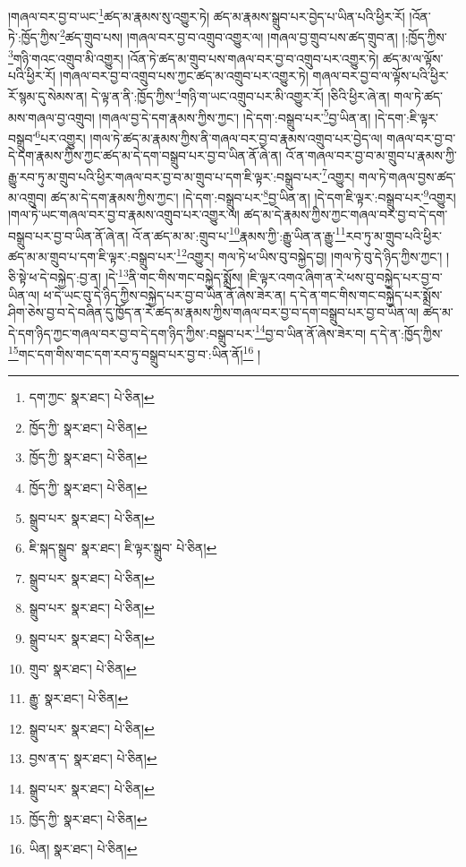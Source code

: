 །གཞལ་བར་བྱ་བ་ཡང་\footnote{དག་ཀྱང་  སྣར་ཐང་།  པེ་ཅིན། }ཚད་མ་རྣམས་སུ་འགྱུར་ཏེ། ཚད་མ་རྣམས་སྒྲུབ་པར་བྱེད་པ་ཡིན་པའི་ཕྱིར་རོ། །འོན་ཏེ་:ཁྱོད་ཀྱིས་\footnote{ཁྱོད་ཀྱི་  སྣར་ཐང་།  པེ་ཅིན། }ཚད་གྲུབ་པས། །གཞལ་བར་བྱ་བ་འགྲུབ་འགྱུར་ལ། །གཞལ་བྱ་གྲུབ་པས་ཚད་གྲུབ་ན། །:ཁྱོད་ཀྱིས་\footnote{ཁྱོད་ཀྱི་  སྣར་ཐང་།  པེ་ཅིན། }གཉི་གའང་འགྲུབ་མི་འགྱུར། །འོན་ཏེ་ཚད་མ་གྲུབ་པས་གཞལ་བར་བྱ་བ་འགྲུབ་པར་འགྱུར་ཏེ། ཚད་མ་ལ་ལྟོས་པའི་ཕྱིར་རོ། །གཞལ་བར་བྱ་བ་འགྲུབ་པས་ཀྱང་ཚད་མ་འགྲུབ་པར་འགྱུར་ཏེ། གཞལ་བར་བྱ་བ་ལ་ལྟོས་པའི་ཕྱིར་རོ་སྙམ་དུ་སེམས་ན། དེ་ལྟ་ན་ནི་:ཁྱོད་ཀྱིས་\footnote{ཁྱོད་ཀྱི་  སྣར་ཐང་།  པེ་ཅིན། }གཉི་ག་ཡང་འགྲུབ་པར་མི་འགྱུར་རོ། །ཅིའི་ཕྱིར་ཞེ་ན། གལ་ཏེ་ཚད་མས་གཞལ་བྱ་འགྲུབ། །གཞལ་བྱ་དེ་དག་རྣམས་ཀྱིས་ཀྱང་། །དེ་དག་:བསྒྲུབ་པར་\footnote{སྒྲུབ་པར་  སྣར་ཐང་།  པེ་ཅིན། }བྱ་ཡིན་ན། །དེ་དག་:ཇི་ལྟར་བསྒྲུབ་\footnote{ཇི་སྐད་སྒྲུབ་  སྣར་ཐང་། ཇི་ལྟར་སྒྲུབ་  པེ་ཅིན། }པར་འགྱུར། །གལ་ཏེ་ཚད་མ་རྣམས་ཀྱིས་ནི་གཞལ་བར་བྱ་བ་རྣམས་འགྲུབ་པར་བྱེད་ལ། གཞལ་བར་བྱ་བ་དེ་དག་རྣམས་ཀྱིས་ཀྱང་ཚད་མ་དེ་དག་བསྒྲུབ་པར་བྱ་བ་ཡིན་ནོ་ཞེ་ན། འོ་ན་གཞལ་བར་བྱ་བ་མ་གྲུབ་པ་རྣམས་ཀྱི་རྒྱུ་རབ་ཏུ་མ་གྲུབ་པའི་ཕྱིར་གཞལ་བར་བྱ་བ་མ་གྲུབ་པ་དག་ཇི་ལྟར་:བསྒྲུབ་པར་\footnote{སྒྲུབ་པར་  སྣར་ཐང་།  པེ་ཅིན། }འགྱུར། གལ་ཏེ་གཞལ་བྱས་ཚད་མ་འགྲུབ། ཚད་མ་དེ་དག་རྣམས་ཀྱིས་ཀྱང་། །དེ་དག་:བསྒྲུབ་པར་\footnote{སྒྲུབ་པར་  སྣར་ཐང་།  པེ་ཅིན། }བྱ་ཡིན་ན། །དེ་དག་ཇི་ལྟར་:བསྒྲུབ་པར་\footnote{སྒྲུབ་པར་  སྣར་ཐང་།  པེ་ཅིན། }འགྱུར། །གལ་ཏེ་ཡང་གཞལ་བར་བྱ་བ་རྣམས་འགྲུབ་པར་འགྱུར་ལ། ཚད་མ་དེ་རྣམས་ཀྱིས་ཀྱང་གཞལ་བར་བྱ་བ་དེ་དག་བསྒྲུབ་པར་བྱ་བ་ཡིན་ནོ་ཞེ་ན། འོ་ན་ཚད་མ་མ་:གྲུབ་པ་\footnote{གྲུབ་  སྣར་ཐང་།  པེ་ཅིན། }རྣམས་ཀྱི་:རྒྱུ་ཡིན་ན་རྒྱུ་\footnote{རྒྱུ་  སྣར་ཐང་།  པེ་ཅིན། }རབ་ཏུ་མ་གྲུབ་པའི་ཕྱིར་ཚད་མ་མ་གྲུབ་པ་དག་ཇི་ལྟར་:བསྒྲུབ་པར་\footnote{སྒྲུབ་པར་  སྣར་ཐང་།  པེ་ཅིན། }འགྱུར། གལ་ཏེ་ཕ་ཡིས་བུ་བསྐྱེད་བྱ། །གལ་ཏེ་བུ་དེ་ཉིད་ཀྱིས་ཀྱང་། །ཅི་སྟེ་ཕ་དེ་བསྐྱེད་:བྱ་ན། །དེ་\footnote{བྱས་ན་ད་  སྣར་ཐང་།  པེ་ཅིན། }ནི་གང་གིས་གང་བསྐྱེད་སྨྲོས། །ཇི་ལྟར་འགའ་ཞིག་ན་རེ་ཕས་བུ་བསྐྱེད་པར་བྱ་བ་ཡིན་ལ། ཕ་དེ་ཡང་བུ་དེ་ཉིད་ཀྱིས་བསྐྱེད་པར་བྱ་བ་ཡིན་ནོ་ཞེས་ཟེར་ན། ད་དེ་ན་གང་གིས་གང་བསྐྱེད་པར་སྨྲོས་ཤིག་ཅེས་བྱ་བ་དེ་བཞིན་དུ་ཁྱོད་ན་རེ་ཚད་མ་རྣམས་ཀྱིས་གཞལ་བར་བྱ་བ་དག་བསྒྲུབ་པར་བྱ་བ་ཡིན་ལ། ཚད་མ་དེ་དག་ཉིད་ཀྱང་གཞལ་བར་བྱ་བ་དེ་དག་ཉིད་ཀྱིས་:བསྒྲུབ་པར་\footnote{སྒྲུབ་པར་  སྣར་ཐང་།  པེ་ཅིན། }བྱ་བ་ཡིན་ནོ་ཞེས་ཟེར་བ། ད་དེ་ན་:ཁྱོད་ཀྱིས་\footnote{ཁྱོད་ཀྱི་  སྣར་ཐང་།  པེ་ཅིན། }གང་དག་གིས་གང་དག་རབ་ཏུ་བསྒྲུབ་པར་བྱ་བ་:ཡིན་ནོ།\footnote{ཡིན།  སྣར་ཐང་།  པེ་ཅིན། } །
